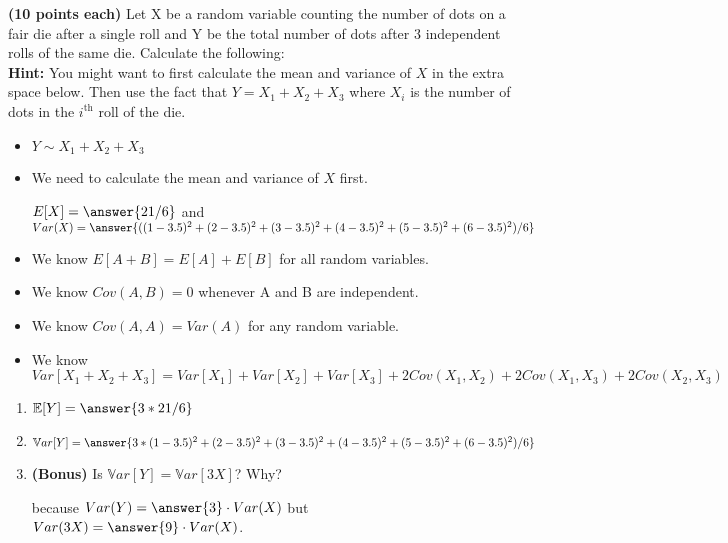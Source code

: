 \documentclass{ximera}
\begin{document}
\begin{problem} { \bf (10 points each)} 
Let X be a random variable counting the number of dots on a fair die after a single roll and Y be the total number of dots after 3 independent rolls of the same die.  Calculate the following:
\\
{\bf Hint:} You might want to first calculate the mean and variance of $X$ in the extra space below. Then use the fact that $Y=X_1+X_2+X_3$ where $X_i$ is the number of dots in the $i^{\text{th}}$ roll of the die.


\begin{explanation}
\begin{itemize}
    \item $Y\sim X_1+X_2+X_3$
    \item We need to calculate the mean and variance of $X$ first.
 
 $E[X]=\answer{21/6}$ and $Var(X)=\answer{((1-3.5)^2+(2-3.5)^2+(3-3.5)^2+(4-3.5)^2+(5-3.5)^2+(6-3.5)^2)/6}$
    \item We know $E[A+B]=E[A]+E[B]$ for all random variables.
    \item We know $Cov(A,B)=0$ whenever A and B are independent.
    \item We know $Cov(A,A)=Var(A)$ for any random variable.
    \item We know
$$Var[X_1+X_2+X_3]=Var[X_1]+Var[X_2]+Var[X_3]+2Cov(X_1,X_2)+2Cov(X_1,X_3)+2Cov(X_2,X_3)   $$
\end{itemize}
\end{explanation} 

\begin{enumerate}
    \item $\mathbb E[Y]=\answer{3*21/6}$
    
    \item $\mathbb Var[Y]=\answer{3*(1-3.5)^2+(2-3.5)^2+(3-3.5)^2+(4-3.5)^2+(5-3.5)^2+(6-3.5)^2)/6}$


    \item {\bf (Bonus)} Is $\mathbb Var[Y]=\mathbb Var[3X]$? Why?
    \begin{multipleChoice}
    \end{multipleChoice}
    because $Var(Y)=\answer{3}\cdot Var(X)$ but $Var(3X)=\answer{9}\cdot Var(X)$.
    \vspace{2cm}
\end{enumerate}
\end{problem}
\end{document}
